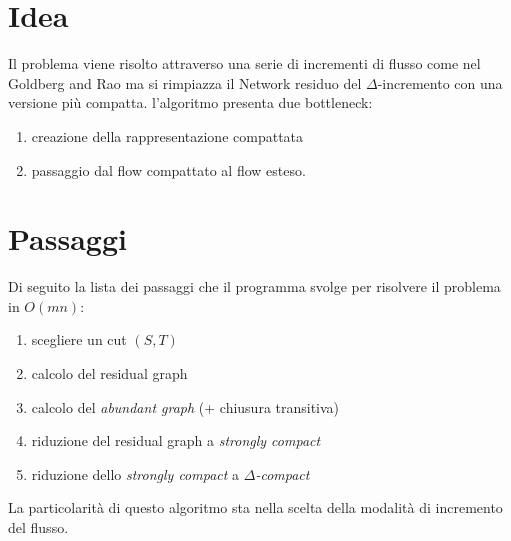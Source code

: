 \documentclass[a4paper, 11pt]{report}
\begin{document}
\section{Idea}
Il problema viene risolto attraverso una serie di incrementi di flusso come nel Goldberg and Rao ma si rimpiazza il Network residuo del $\Delta$-incremento con una versione più compatta.
l'algoritmo presenta due bottleneck: \begin{enumerate}
    \item creazione della rappresentazione compattata
    \item passaggio dal flow compattato al flow esteso.
\end{enumerate}
\section{Passaggi}

Di seguito la lista dei passaggi che il programma svolge per risolvere il problema in $O(mn)$:
\begin{enumerate}
    \item scegliere un cut $(S,T)$
    \item calcolo del residual graph
    \item calcolo del \textit{abundant graph} (+ chiusura transitiva)
    \item riduzione del residual graph a \textit{strongly compact}
    \item riduzione dello \textit{strongly compact} a \textit{$\Delta$-compact}
\end{enumerate}

La particolarità di questo algoritmo sta nella scelta della modalità di incremento del flusso.
\newpage
\end{document}
